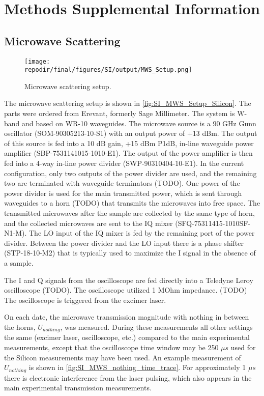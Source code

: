 \section{Methods Supplemental Information}

\subsection{Microwave Scattering}

\begin{figure}[]
\centering
\texttt{[image: \\repodir/final/figures/SI/output/MWS\_Setup.png]}
\caption{Microwave scattering setup.}
\label{fig:SI_MWS_Setup}
\end{figure}

The microwave scattering setup is shown in \ref{fig:SI_MWS_Setup_Silicon}. The parts were ordered from Erevant, formerly Sage Millimeter. The system is W-band and based on WR-10 waveguides. The microwave source is a 90 GHz Gunn oscillator (SOM-90305213-10-S1) with an output power of +13 dBm. The output of this source is fed into a 10 dB gain, +15 dBm P1dB, in-line waveguide power amplifier (SBP-7531141015-1010-E1). The output of the power amplifier is then fed into a 4-way in-line power divider (SWP-90310404-10-E1). In the current configuration, only two outputs of the power divider are used, and the remaining two are terminated with waveguide terminators (TODO). One power of the power divider is used for the main transmitted power, which is sent through waveguides to a horn (TODO) that transmits the microwaves into free space. The transmitted microwaves after the sample are collected by the same type of horn, and the collected microwaves are sent to the IQ mixer (SFQ-75311415-1010SF-N1-M). The LO input of the IQ mixer is fed by the remaining port of the power divider. Between the power divider and the LO input there is a phase shifter (STP-18-10-M2) that is typically used to maximize the I signal in the absence of a sample. 

The I and Q signals from the oscilloscope are fed directly into a Teledyne Leroy oscilloscope (TODO). The oscilloscope utilized 1 MOhm impedance. (TODO) The oscilloscope is triggered from the excimer laser. 

On each date, the microwave transmission magnitude with nothing in between the horns, $U_{nothing}$, was measured. During these measurements all other settings the same (excimer laser, oscilloscope, etc.) compared to the main experimental measurements, except that the oscilloscope time window may be 250 $\mu s$ used for the Silicon measurements may have been used. An example measurement of $U_{nothing}$ is shown in \ref{fig:SI_MWS_nothing_time_trace}. For approximately 1 $\mu s$ there is electronic interference from the laser pulsing, which also appears in the main experimental transmission measurements. 



